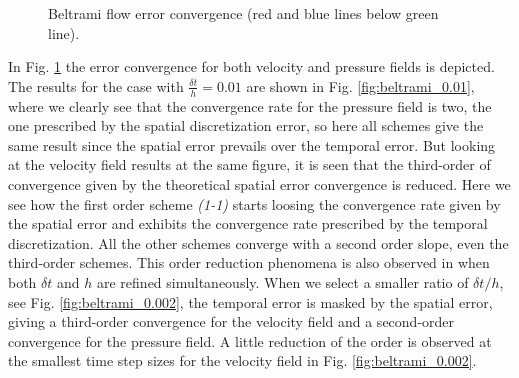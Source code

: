 \begin{figure}[h!]
  \centering
  \caption{Beltrami flow error convergence (red and blue lines below green line).}
  \label{fig:beltrami}
\end{figure}
In Fig. \ref{fig:beltrami} the error convergence for both velocity and pressure fields is depicted. The results for the case with $\frac{\delta t}{h}=0.01$ are shown in Fig. \ref{fig:beltrami_0.01}, where we clearly see that the convergence rate for the pressure field is two, the one prescribed by the spatial discretization error, so here all schemes give the same result since the spatial error prevails over the temporal error. But looking at the velocity field results at the same figure, it is seen that the third-order of convergence given by the theoretical spatial error convergence is reduced. Here we see how the first order scheme \textit{(1-1)} starts loosing the convergence rate given by the spatial error and exhibits the convergence rate prescribed by the temporal discretization. All the other schemes converge with a second order slope, even the third-order schemes. This order reduction phenomena is also observed in \cite{sanz-serna_convergence_1986} when both $\delta t$ and $h$ are refined simultaneously.
When we select a smaller ratio of $\delta t/h$, see Fig. \ref{fig:beltrami_0.002}, the temporal error is masked by the spatial error, giving a third-order convergence for the velocity field and a second-order convergence for the pressure field. A little reduction of the order is observed at the smallest time step sizes for the velocity field in Fig. \ref{fig:beltrami_0.002}.

